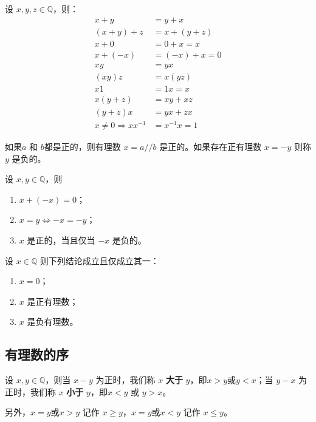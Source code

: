 \begin{theorem}[有理数的代数运算法则]
	设 $x,y,z\in \mathbb Q$，则：
$$
\begin{aligned}
	x+y&=y+x\\
	(x+y)+z & = x+(y+z)\\
	x+0 & = 0+x=x\\
	x + (-x)& = (-x) + x = 0\\
	xy&=yx\\
	(xy)z & = x(yz)\\
	x1&=1x=x\\
	x(y+z) & = xy+xz\\
	(y+z)x & = yx+zx\\
	x\ne 0 \Rightarrow xx^{-1} &= x^{-1} x=1
\end{aligned}
$$

\end{theorem}

\begin{definition}[正、负]
	如果$a$ 和 $b$都是正的，则有理数 $x=a//b$ 是正的。如果存在正有理数 $x=-y$ 则称 $y$ 是负的。
\end{definition}

\begin{lemma}
	设 $x,y\in \mathbb Q$，则
	\begin{enumerate}
		\item $x+(-x) = 0$；
		\item $x=y\iff -x=-y$；
		\item $x$ 是正的，当且仅当 $-x$ 是负的。
	\end{enumerate}
\end{lemma}

\begin{theorem}[有理数的三奇性]
	设 $x\in \mathbb Q$ 则下列结论成立且仅成立其一：
	
	\begin{enumerate}
		\item $x=0$；
		\item $x$ 是正有理数；
		\item $x$ 是负有理数。
	\end{enumerate}
\end{theorem}

\subsection{有理数的序}

\begin{definition}[有理数的序]
	设 $x,y\in \mathbb Q$，则当 $x-y$ 为正时，我们称 $x$ \textbf{大于} $y$，即$x>y$或$y<x$；当 $y-x$ 为正时，我们称 $x$ \textbf{小于} $y$，即$x<y$ 或 $y>x$。
	
	\noindent 另外，$x=y$或$x>y$ 记作 $x\ge y$，$x=y$或$x<y$ 记作 $x\le y$。
\end{definition}

